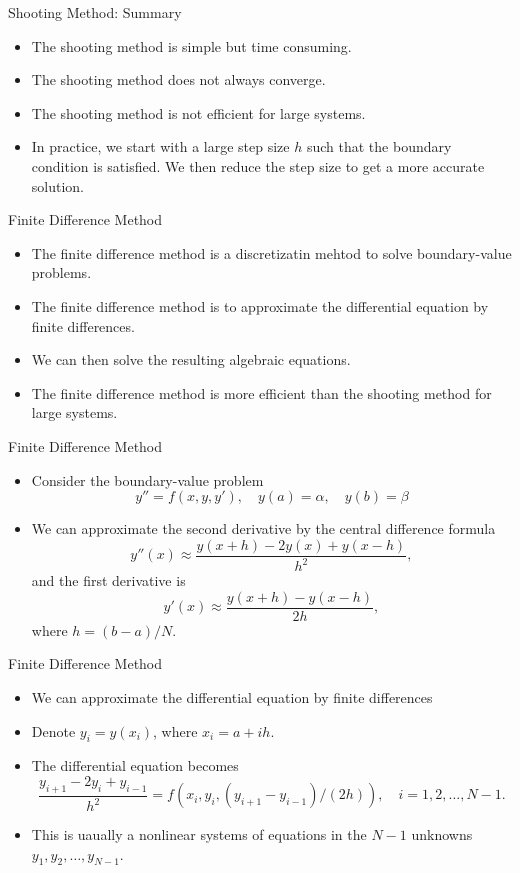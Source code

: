 \documentclass{beamer}
\begin{document}
\begin{frame}{Shooting Method: Summary}
    \begin{itemize}
        \item The shooting method is simple but time consuming.
        \item The shooting method does not always converge.
        \item The shooting method is not efficient for large systems.
        \item In practice, we start with a large step size $h$ such that the boundary
        condition is satisfied. We then reduce the step size to get a more accurate solution.

    \end{itemize}
\end{frame}
\begin{frame}{Finite Difference Method}
    \begin{itemize}
        \item The finite difference method is a discretizatin mehtod to solve boundary-value problems.
        \item The finite difference method is to approximate the differential equation by finite differences.
        \item We can then solve the resulting algebraic equations.
        \item The finite difference method is more efficient than the shooting method for large systems.
    \end{itemize}

\end{frame}
\begin{frame}{Finite Difference Method}
    \begin{itemize}
        \item Consider the boundary-value problem
        \[
        y'' = f(x, y, y'), \quad y(a) = \alpha, \quad y(b) = \beta
        \]
        \item We can approximate the second derivative by the central difference formula
        \[
        y''(x) \approx \frac{y(x+h) - 2y(x) + y(x-h)}{h^2},
        \]
        and the first derivative is 
        \[
        y'(x) \approx \frac{y(x+h) - y(x-h)}{2h},
        \]
        where $h=(b-a)/N$. 
        
    \end{itemize}
\end{frame}
\begin{frame}{Finite Difference Method}
\begin{itemize}
    \item We can approximate the differential equation by finite differences
    \item Denote $y_i=y(x_i)$, where $x_i=a+ih$.
    \item The differential equation becomes 
    \[
    \frac{y_{i+1} - 2y_i + y_{i-1}}{h^2} = f(x_i, y_i, (y_{i+1} - y_{i-1})/(2h)), \quad i=1, 2, \ldots, N-1.
    \]
   \item This is uaually a nonlinear systems of equations in the $N-1$ unknowns $y_1, y_2, \ldots, y_{N-1}$.
\end{itemize}
\end{frame}
\end{document}

